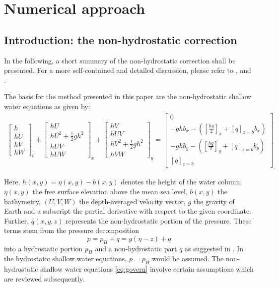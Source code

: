 
\section{Numerical approach}
\subsection{Introduction: the non-hydrostatic correction}
In the following, a short summary of the non-hydrostatic correction shall be presented. For a more self-contained and detailed discussion, please refer to  \cite{samfass14extension}, \cite{cui} and \cite{fuchs}. 

The basis for the method presented in this paper are the non-hydrostatic shallow water equations as given by:
\begin{align}
\boxed{
{\begin{bmatrix}
h \\
hU\\
hV\\
hW
\end{bmatrix}}_{t}
+
{\begin{bmatrix}
hU \\
hU^2+\frac{1}{2}gh^2\\
hUV\\
hUW
\end{bmatrix}}_{x}
+
{\begin{bmatrix}
hV \\
hUV\\
hV^2+\frac{1}{2}gh^2\\
hVW
\end{bmatrix}}_{y}
=
{\begin{bmatrix}
0 \\
-ghb_x -\left([ \frac{hq}{2}]_x+[q]_{z=b}b_x \right)\\
-ghb_y -\left([ \frac{hq}{2}]_y+[q]_{z=b}b_y \right)\\
[q]_{z=b}
\end{bmatrix}_.}}
\label{eq:govern}
\end{align}

Here, $h (x,y)=\eta (x,y) -b(x,y)$ denotes the height of the water column, $\eta (x,y)$ the free surface elevation above the mean sea level, $b (x,y)$ the bathymetry, $(U,V,W)$ the depth-averaged velocity vector, $g$ the gravity of Earth and a subscript the partial derivative with respect to the given coordinate. Further, $q (x,y,z)$ represents the non-hydrostatic portion of the pressure. These terms stem from the pressure decomposition
\begin{equation}
p= p_H + q = g (\eta -z) +q
\end{equation}
into a hydrostatic portion $p_H$ and a non-hydrostatic part $q$ as suggested in \cite{casu}. In the hydrostatic shallow water equations, $p=p_H$ would be assumed. The non-hydrostatic shallow water equations \ref{eq:govern} involve certain assumptions which are reviewed subsequently.

